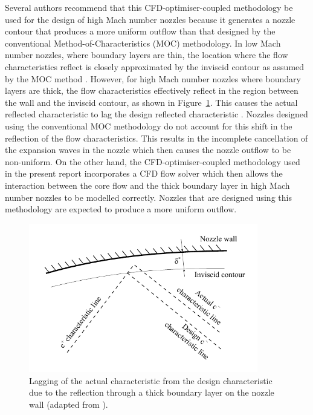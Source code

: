 \documentclass[12pt,a4paper]{article}
\begin{document}
Several authors  recommend that this 
CFD-optimiser-coupled methodology be used for the design of high Mach number 
nozzles because it generates a nozzle contour that produces a more uniform 
outflow than that designed by the conventional Method-of-Characteristics (MOC) 
methodology. In low Mach number nozzles, where boundary layers are thin, the 
location where the flow characteristics reflect is closely approximated by the 
inviscid contour as assumed by the MOC method . However, 
for high Mach number nozzles where boundary layers are thick, the flow 
characteristics effectively reflect in the region between the wall and the 
inviscid contour, as shown in Figure~\ref{f:characteristic-lag}. This causes the 
actual reflected characteristic to lag the design reflected characteristic 
. Nozzles designed using the conventional MOC methodology 
do not account for this shift in the reflection of the flow characteristics. 
This results in the incomplete cancellation of the expansion waves in the nozzle 
which then causes the nozzle outflow to be non-uniform. On the other hand, the
CFD-optimiser-coupled methodology used in the present report incorporates a
CFD flow solver which then allows the interaction between the core flow and the 
thick boundary layer in high Mach number nozzles to be modelled correctly. 
Nozzles that are designed using this methodology are expected to produce a more 
uniform outflow.
%
\begin{figure}[htbp]
 \begin{center}
  \includegraphics[width=10cm]{figs/flow-characteristic-lag.pdf}
  \caption{Lagging of the actual characteristic from the design characteristic
           due to the reflection through a thick boundary layer on the nozzle
           wall (adapted from \protect {}).}
  \label{f:characteristic-lag}
 \end{center}
\end{figure}
%
\end{document}

